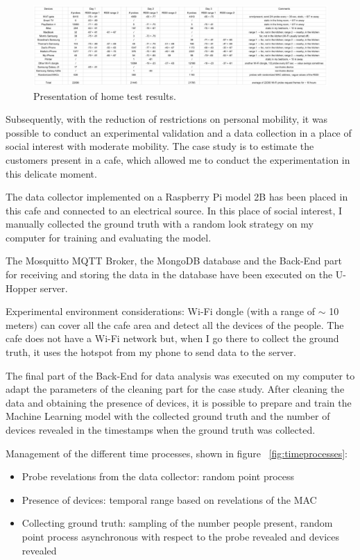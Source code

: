 \begin{figure}[h]
\centering 
\includegraphics[width=1.02\textwidth]{images/sniffertest} 
\caption{Presentation of home test results.}
\label{fig:sniffertest}
\end{figure}

Subsequently, with the reduction of restrictions on personal mobility, it was possible to conduct an experimental validation and a data collection in a place of social interest with moderate mobility. The case study is to estimate the customers present in a cafe, which allowed me to conduct the experimentation in this delicate moment.

The data collector implemented on a Raspberry Pi model 2B has been placed in this cafe and connected to an electrical source. In this place of social interest, I manually collected the ground truth with a random look strategy on my computer for training and evaluating the model.

The Mosquitto MQTT Broker, the MongoDB database and the Back-End part for receiving and storing the data in the database have been executed on the U-Hopper server.

Experimental environment considerations: Wi-Fi dongle (with a range of $\sim$ 10 meters) can cover all the cafe area and detect all the devices of the people. The cafe does not have a Wi-Fi network but, when I go there to collect the ground truth, it uses the hotspot from my phone to send data to the server.

The final part of the Back-End for data analysis was executed on my computer to adapt the parameters of the cleaning part for the case study. After cleaning the data and obtaining the presence of devices, it is possible to prepare and train the Machine Learning model with the collected ground truth and the number of devices revealed in the timestamps when the ground truth was collected.


Management of the different time processes, shown in figure ~\ref{fig:timeprocesses}:
\begin{itemize}
  \item Probe revelations from the data collector: random point process
  \item Presence of devices: temporal range based on revelations of the MAC
  \item Collecting ground truth: sampling of the number people present, random point process asynchronous with respect to the probe revealed and devices revealed
\end{itemize}

